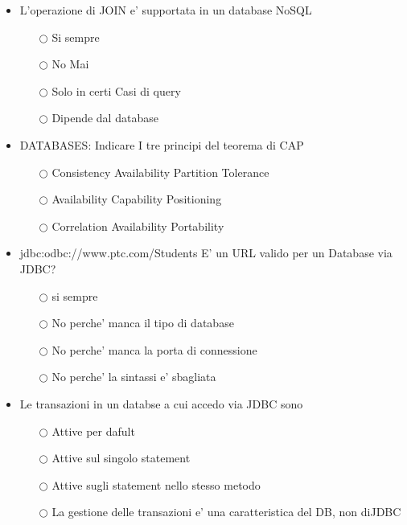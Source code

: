 \documentclass[10pt,twocolumn]{article}
\begin{document}
\begin{itemize}
    \item L'operazione di JOIN e' supportata in un database NoSQL
          \begin{itemize}
              \item[$\bigcirc$] Si sempre
              \item[$\bigcirc$] No Mai
              \item[$\bigcirc$] Solo in certi Casi di query
              \item[$\bigcirc$] Dipende dal database
          \end{itemize}
\end{itemize}
\begin{itemize}
    \item DATABASES: Indicare I tre principi del teorema di CAP
          \begin{itemize}
              \item[$\bigcirc$] Consistency Availability Partition Tolerance
              \item[$\bigcirc$] Availability Capability Positioning
              \item[$\bigcirc$] Correlation Availability Portability
          \end{itemize}
\end{itemize}
\begin{itemize}
    \item jdbc:odbc://www.ptc.com/Students E' un URL valido per un Database via JDBC?
          \begin{itemize}
              \item[$\bigcirc$] si sempre
              \item[$\bigcirc$] No perche' manca il tipo di database
              \item[$\bigcirc$] No perche' manca la porta di connessione
              \item[$\bigcirc$] No perche' la sintassi e' sbagliata
          \end{itemize}
\end{itemize}
\begin{itemize}
    \item Le transazioni in un databse a cui accedo via JDBC sono
          \begin{itemize}
              \item[$\bigcirc$] Attive per dafult
              \item[$\bigcirc$] Attive sul singolo statement
              \item[$\bigcirc$] Attive sugli statement nello stesso metodo
              \item[$\bigcirc$] La gestione delle transazioni e' una caratteristica del DB, non diJDBC
          \end{itemize}
\end{itemize}
\end{document}
